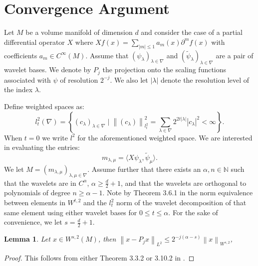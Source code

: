 \documentclass[12pt]{amsart}
\title{}
\author{}
\date{} %
\newtheorem{lemma}{Lemma}
\newcommand{\N}{\mathbb{N}}
\newcommand{\card}[1]{{\lvert#1\rvert}}
\newcommand{\abs}[1]{\ensuremath{\left\lvert #1\right\rvert}}
\newcommand{\norm}[1]{\ensuremath{\left\lVert #1\right\rVert}}
\begin{document}
\section{Convergence Argument}

Let $M$ be a volume manifold of dimension $d$ and consider the case of a partial differential operator $X$ where $X f(x) = \sum_{\abs{m}\leq 1} a_m(x) \partial^m f(x)$ with coefficients $a_m \in C^{\infty}(M)$. Assume that $(\psi_\lambda)_{\lambda \in \nabla}$ and $(\tilde{\psi}_\lambda)_{\lambda \in \nabla}$ are a pair of wavelet bases. We denote by $P_j$ the projection onto the scaling functions associated with $\psi$ of resolution $2^{-j}$. We also let $\card{\lambda}$ denote the resolution level of the index $\lambda$. 

Define weighted spaces as:
\begin{equation}
	l_t^2(\nabla) = \left\{ (c_\lambda)_{\lambda\in\nabla} \mid \norm{(c_\lambda)}_{l^2_t}^2 = \sum_{\lambda \in \nabla} 2^{2t\card{\lambda}}\abs{c_\lambda}^2 < \infty  \right\}.
\end{equation}
When $t = 0$ we write $l^2$ for the aforementioned weighted space. We are interested in evaluating the entries:
\begin{equation}
	m_{\lambda,\mu} = \langle X \psi_\lambda, \tilde{\psi}_\mu \rangle.
\end{equation}
We let $M=(m_{\lambda,\mu})_{\lambda,\mu \in \nabla}$. Assume further that there exists an $\alpha,n \in \N$ such that the wavelets are in $C^{\alpha}$, $\alpha \geq \frac{d}{2} + 1$, and that the wavelets are orthogonal to polynomials of degree $n \geq \alpha - 1$.  Note by Theorem 3.6.1 in \cite{} the norm equivalence between elements in $W^{t,2}$ and the $l_t^2$ norm of the wavelet decomposition of that same element using either wavelet bases for $0\leq t \leq \alpha$. For the sake of convenience, we let $s = \frac{d}{2} + 1$. 

\begin{lemma}
	Let $x \in W^{s,2}(M)$, then $\norm{x - P_j x}_{L^2} \leq  2^{-j(\alpha - s)}\norm{x}_{W^{s,2}}$,
\end{lemma}
\begin{proof}
	This follows from either Theorem 3.3.2 or 3.10.2 in \cite{}.
\end{proof}
\end{document}
